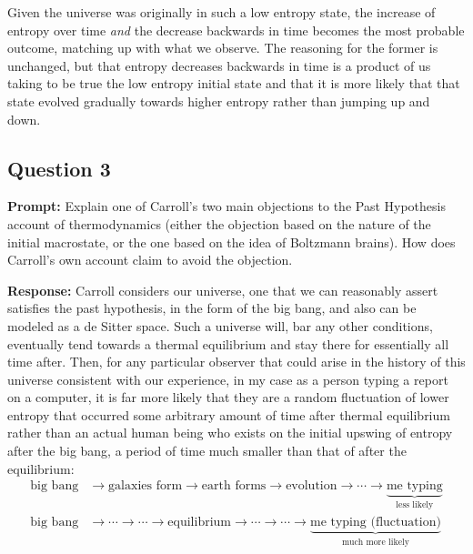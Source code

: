 \documentclass{article}
\begin{document}
Given the universe was originally in such a low entropy state, the increase of entropy over time \textit{and} the decrease backwards in time becomes the most probable outcome, matching up with what we observe.
The reasoning for the former is unchanged, but that entropy decreases backwards in time is a product of us taking to be true the low entropy initial state and that it is more likely that that state evolved gradually towards higher entropy rather than jumping up and down.

\subsection*{Question 3}
\noindent\textbf{Prompt:} Explain one of Carroll’s two main objections to the Past Hypothesis account of thermodynamics (either the objection based on the nature of the initial macrostate, or the one based on the idea of Boltzmann brains). How does Carroll’s own account claim to avoid the objection.
\bigskip

\noindent\textbf{Response:} Carroll considers our universe, one that we can reasonably assert satisfies the past hypothesis, in the form of the big bang, and also can be modeled as a de Sitter space. Such a universe will, bar any other conditions, eventually tend towards a thermal equilibrium and stay there for essentially all time after. Then, for any particular observer that could arise in the history of this universe consistent with our experience, in my case as a person typing a report on a computer, it is far more likely that they are a random fluctuation of lower entropy that occurred some arbitrary amount of time after thermal equilibrium rather than an actual human being who exists on the initial upswing of entropy after the big bang, a period of time much smaller than that of after the equilibrium:
\begin{align*}
  \text{big bang}&\rightarrow \text{galaxies form}\rightarrow \text{earth forms}\rightarrow\text{evolution}\rightarrow\cdots\rightarrow\underbrace{\text{me typing}}_{\text{less likely}}\tag{near big bang}\\
  \text{big bang}&\rightarrow\cdots\rightarrow\cdots\rightarrow\text{equilibrium}\rightarrow\cdots\rightarrow\cdots\rightarrow\underbrace{\text{me typing (fluctuation)}}_{\text{much more likely}}\tag{after equilibrium}
\end{align*} 
\end{document}
